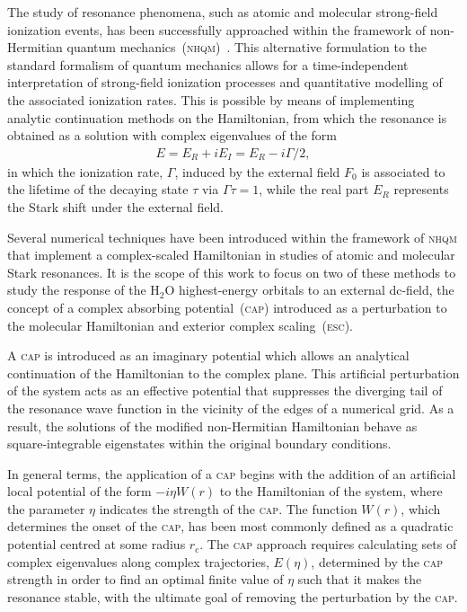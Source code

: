 The study of resonance phenomena, such as atomic and molecular
strong-field ionization events, has been successfully approached
within the framework of non-Hermitian quantum
mechanics~(\textsc{nhqm})~\cite{Moiseyev_NHQM}. This alternative
formulation to the standard formalism of quantum mechanics allows for
a time-independent interpretation of strong-field ionization processes
and quantitative modelling of the associated ionization rates. This is
possible by means of implementing analytic continuation methods on the
Hamiltonian, from which the resonance is obtained as a solution with
complex eigenvalues of the form
%
\begin{eqnarray}
  E = E_{R} + i E_{I} = E_{R} - i \Gamma/2,
  \label{eq:complex_eigenE}
\end{eqnarray}
%
in which the ionization rate, $\Gamma$, induced by the external field
$F_{0}$ is associated to the lifetime of the decaying state $\tau$ via
$\Gamma\tau = 1$, while the real part $E_{R}$ represents the Stark
shift under the external field.

Several numerical techniques have been introduced within the framework
of \textsc{nhqm} that implement a complex-scaled Hamiltonian in
studies of atomic and molecular Stark resonances. It is the scope of
this work to focus on two of these methods to study the response of
the H$_{2}$O highest-energy orbitals to an external dc-field, the
concept of a complex absorbing potential~(\textsc{cap}) introduced as
a perturbation to the molecular Hamiltonian and exterior complex
scaling~(\textsc{esc}).




A \textsc{cap} is introduced as an imaginary potential which allows an
analytical continuation of the Hamiltonian to the complex plane. This
artificial perturbation of the system acts as an effective potential
that suppresses the diverging tail of the resonance wave function in
the vicinity of the edges of a numerical grid. As a result, the
solutions of the modified non-Hermitian Hamiltonian behave as
square-integrable eigenstates within the original boundary conditions.

In general terms, the application of a \textsc{cap} begins with the
addition of an artificial local potential of the form $-i \eta W(r)$
to the Hamiltonian of the system, where the parameter $\eta$ indicates
the strength of the \textsc{cap}. The function $W(r)$, which
determines the onset of the \textsc{cap}, has been most commonly
defined as a quadratic potential centred at some radius
$r_{\mathrm{c}}$. The \textsc{cap} approach requires calculating sets
of complex eigenvalues along complex trajectories, $E(\eta)$,
determined by the \textsc{cap} strength in order to find an optimal
finite value of $\eta$ such that it makes the resonance stable, with
the ultimate goal of removing the perturbation by the \textsc{cap}.

